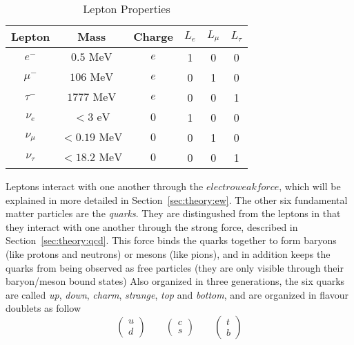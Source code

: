 \begin{table}[h!]
\begin{center}
\begin{tabular}{|c|c|c| c c c|}
\hline
Lepton        & Mass           & Charge & $L_{e}$ & $L_{\mu}$ & $L_{\tau}$ \\
\hline
$e^{-}$      & $0.5 \mbox{ MeV}$   & $e$ & 1       & 0         & 0 \\
$\mu^{-}$    & $106 \mbox{ MeV}$   & $e$ & 0       & 1         & 0 \\
$\tau^{-}$   & $1777 \mbox{ MeV}$  & $e$ & 0       & 0         & 1 \\
\hline
$\nu_{e}$    & $< 3 \mbox{ eV}$       & $0$    & 1       & 0         & 0 \\
$\nu_{\mu}$  & $< 0.19 \mbox{ MeV}$   & $0$    & 0       & 1         & 0 \\
$\nu_{\tau}$ & $< 18.2 \mbox{ MeV}$   & $0$    & 0       & 0         & 1 \\
\hline
\end{tabular}
\end{center}
\caption{Lepton Properties}
\label{table:theory:lepprop}

\end{table}
Leptons interact with one another through the $electroweak force$, which will be explained in more detailed in Section~\ref{sec:theory:ew}.\newline
The other six fundamental matter particles are the \emph{quarks}. They are distingushed from the leptons in that they interact with one another through the strong force, described in Section~\ref{sec:theory:qcd}. This force binds the quarks together to form baryons (like protons and neutrons) or mesons (like pions), and in addition keeps the quarks from being observed as free particles (they are only visible through their baryon/meson bound states) Also organized in three generations, the six quarks are called \textit{up}, \textit{down}, \textit{charm}, \textit{strange}, \textit{top} and \textit{bottom}, and are organized in flavour doublets as follow
\begin{equation}
\label{eqn:quark_flavor_doublets}
\begin{pmatrix} u \\ d \end{pmatrix} \qquad
\begin{pmatrix} c \\ s \end{pmatrix} \qquad
\begin{pmatrix} t \\ b \end{pmatrix}
\end{equation}

